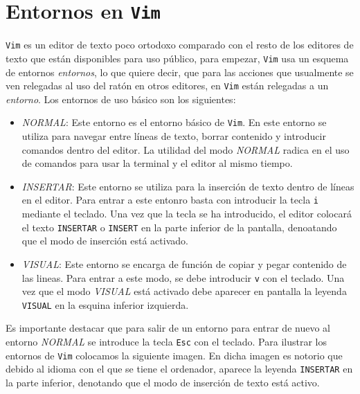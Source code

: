 \documentclass[10pt]{article}
\begin{document}
\section{Entornos en \texttt{Vim}}
\texttt{Vim} es un editor de texto poco ortodoxo comparado con el resto de los editores de texto que están disponibles para uso público, para empezar, \texttt{Vim} usa un esquema de entornos \textit{entornos}, lo que quiere decir, que para las acciones que usualmente se ven relegadas al uso del ratón en otros editores, en \texttt{Vim} están relegadas a un \textit{entorno}. Los entornos de uso básico son los siguientes:
\begin{itemize}
	\item \textit{NORMAL}: Este entorno es el entorno básico de \texttt{Vim}. En este entorno se utiliza para navegar entre líneas de texto, borrar contenido y introducir comandos dentro del editor.
	      La utilidad del modo \textit{NORMAL} radica en el uso de comandos para usar la terminal y el editor al mismo tiempo. 
	\item \textit{INSERTAR}: Este entorno se utiliza para la inserción de texto dentro de líneas en el editor. Para entrar a este entonro basta con introducir la tecla \texttt{i} mediante el teclado.
Una vez que la tecla se ha introducido, el editor colocará el texto \texttt{INSERTAR} o \texttt{INSERT} en la parte inferior de la pantalla, denoatando que el modo de inserción está activado. 
	\item \textit{VISUAL}: Este entorno se encarga de función de copiar y pegar contenido de las lineas. Para entrar a este modo, se debe introducir \texttt{v} con el teclado.
Una vez que el modo \textit{VISUAL} está activado debe aparecer en pantalla la leyenda \texttt{VISUAL} en la esquina inferior izquierda. 
\end{itemize}
Es importante destacar que para salir de un entorno para entrar de nuevo al entorno \textit{NORMAL} se introduce la tecla \texttt{Esc} con el teclado. Para ilustrar los entornos de \texttt{Vim} colocamos la siguiente imagen. En dicha imagen es notorio que debido al idioma con el que se tiene el ordenador, aparece la leyenda \texttt{INSERTAR} en la parte inferior, denotando que el modo de inserción de texto está activo. 
\end{document}
